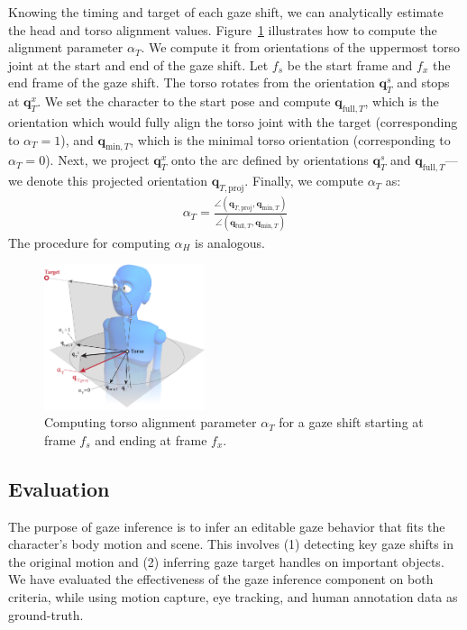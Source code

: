 Knowing the timing and target of each gaze shift, we can analytically estimate the head and torso alignment values. Figure~\ref{fig:GazeAlignmentInference} illustrates how to compute the alignment parameter $\alpha_{T}$. We compute it from orientations of the uppermost torso joint at the start and end of the gaze shift. Let $f_s$ be the start frame and $f_x$ the end frame of the gaze shift. The torso rotates from the orientation $\mathbf{q}_T^s$ and stops at $\mathbf{q}_T^x$. We set the character to the start pose and compute $\mathbf{q}_{\mathrm{full},T}$, which is the orientation which would fully align the torso joint with the target (corresponding to $\alpha_T = 1$), and $\mathbf{q}_{\mathrm{min},T}$, which is the minimal torso orientation (corresponding to $\alpha_{T} = 0$). Next, we project $\mathbf{q}_{T}^x$ onto the arc defined by orientations $\mathbf{q}_{T}^s$ and $\mathbf{q}_{\mathrm{full},T}$---we denote this projected orientation $\mathbf{q}_{T,\mathrm{proj}}$. Finally, we compute $\alpha_T$ as:
%
\begin{align} \label{eq:GazeAlignmentInference}
\alpha_T = \frac{\angle(\mathbf{q}_{T,\mathrm{proj}}, \mathbf{q}_{\mathrm{min},T})}{\angle(\mathbf{q}_{\mathrm{full},T}, \mathbf{q}_{\mathrm{min},T})}
\end{align}
%
The procedure for computing $\alpha_{H}$ is analogous.

\begin{figure}
\centering
\includegraphics[width=0.42\textwidth]{Figures/GazeAlignmentInference.pdf}
\caption{Computing torso alignment parameter $\alpha_T$ for a gaze shift starting at frame $f_s$ and ending at frame $f_x$.}
\label{fig:GazeAlignmentInference}
\end{figure}

\subsection{Evaluation}
\label{sec:GazeInferenceEvaluation}

The purpose of gaze inference is to infer an editable gaze behavior that fits the character's body motion and scene. This involves (1) detecting key gaze shifts in the original motion and (2) inferring gaze target handles on important objects. We have evaluated the effectiveness of the gaze inference component on both criteria, while using motion capture, eye tracking, and human annotation data as ground-truth.

